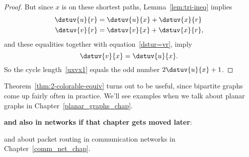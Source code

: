 \begin{editingnotes}
\begin{proof}
But since $x$ is on these shortest paths, Lemma~\ref{lem:tri-ineq} implies
\begin{align*}
\dstuv{u}{r} & = \dstuv{u}{x} + \dstuv{x}{r}\\
\dstuv{v}{r} & = \dstuv{v}{x} + \dstuv{x}{r},
\end{align*}
and these equalities together with equation~\eqref{dstur=vr},
imply
\[
\dstuv{v}{x} = \dstuv{u}{x}.
\]
So the cycle length~\ref{uxvx1} equals the odd number $2\dstuv{u}{x}+1$.
\end{proof}

\end{editingnotes}

Theorem~\ref{thm:2-colorable-equiv} turns out to be useful, since bipartite
graphs come up fairly often in practice.  We'll see examples when we talk
about planar graphs in Chapter~\ref{planar_graphs_chap}. 

\begin{editingnotes}
\textbf{and also in networks if that chapter gets moved later}:

and about packet routing in communication networks
in Chapter~\ref{comm_net_chap}.

\end{editingnotes}


